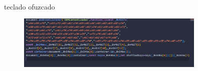 \documentclass{article}
\begin{document}
\\teclado ofuzcado
\begin{figure}[H]
		          \centering
		          \includegraphics[width=0.8\textwidth,keepaspectratio]                       {img/ofuzcar.png}
    \end{figure}  
\\
\end{document}
